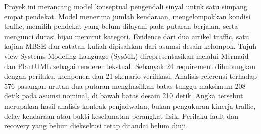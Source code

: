 Proyek ini merancang model konseptual pengendali sinyal untuk satu simpang empat pendekat. Model menerima jumlah kendaraan, mengelompokkan kondisi traffic, memilih pendekat yang belum dilayani pada putaran berjalan, serta mengunci durasi hijau menurut kategori. Evidence dari dua artikel traffic, satu kajian MBSE dan catatan kuliah dipisahkan dari asumsi desain kelompok. Tujuh view Systems Modeling Language (SysML) direpresentasikan melalui Mermaid dan PlantUML sebagai renderer tekstual. Sebanyak 24 requirement dihubungkan dengan perilaku, komponen dan 21 skenario verifikasi. Analisis referensi terhadap 576 pasangan urutan dua putaran menghasilkan batas tunggu maksimum 208 detik pada asumsi nominal, di bawah batas desain 210 detik. Angka tersebut merupakan hasil analisis kontrak penjadwalan, bukan pengukuran kinerja traffic, delay kendaraan atau bukti keselamatan perangkat fisik. Perilaku fault dan recovery yang belum dieksekusi tetap ditandai belum diuji.
